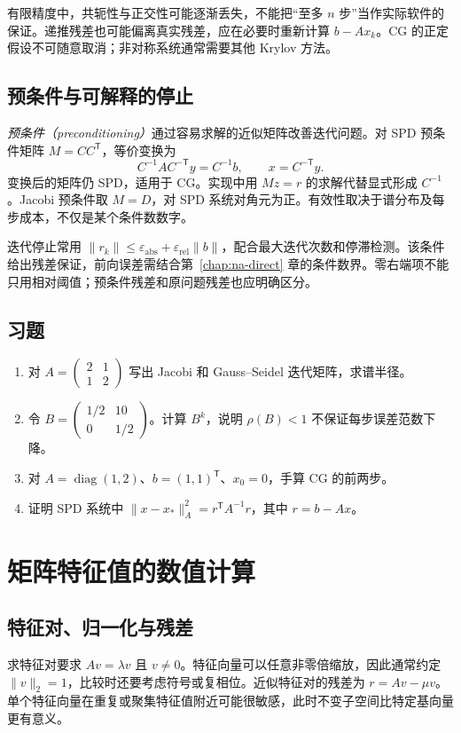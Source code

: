 \documentclass[UTF8,12pt,a4paper,fontset=fandol]{ctexbook}
\begin{document}
有限精度中，共轭性与正交性可能逐渐丢失，不能把“至多 $n$ 步”当作实际软件的保证。递推残差也可能偏离真实残差，应在必要时重新计算 $b-Ax_k$。CG 的正定假设不可随意取消；非对称系统通常需要其他 Krylov 方法。

\section{预条件与可解释的停止}
\emph{预条件（preconditioning）}通过容易求解的近似矩阵改善迭代问题。对 SPD 预条件矩阵 $M=CC^{\mathsf T}$，等价变换为
\[
 C^{-1}AC^{-\mathsf T}y=C^{-1}b,\qquad x=C^{-\mathsf T}y.
\]
变换后的矩阵仍 SPD，适用于 CG。实现中用 $Mz=r$ 的求解代替显式形成 $C^{-1}$。Jacobi 预条件取 $M=D$，对 SPD 系统对角元为正。有效性取决于谱分布及每步成本，不仅是某个条件数数字。

迭代停止常用 $\|r_k\|\le\varepsilon_{\mathrm{abs}}+\varepsilon_{\mathrm{rel}}\|b\|$，配合最大迭代次数和停滞检测。该条件给出残差保证，前向误差需结合第~\ref{chap:na-direct} 章的条件数界。零右端项不能只用相对阈值；预条件残差和原问题残差也应明确区分。

\section{习题}
\begin{enumerate}[label=\arabic*.]
\item\label{exr:na-iter-jacobi} 对 $A=\begin{pmatrix}2&1\\1&2\end{pmatrix}$ 写出 Jacobi 和 Gauss--Seidel 迭代矩阵，求谱半径。
\item\label{exr:na-iter-nonnormal} 令 $B=\begin{pmatrix}1/2&10\\0&1/2\end{pmatrix}$。计算 $B^k$，说明 $\rho(B)<1$ 不保证每步误差范数下降。
\item\label{exr:na-iter-cg} 对 $A=\operatorname{diag}(1,2)$、$b=(1,1)^{\mathsf T}$、$x_0=0$，手算 CG 的前两步。
\item\label{exr:na-iter-energy} 证明 SPD 系统中 $\|x-x_*\|_A^2=r^{\mathsf T}A^{-1}r$，其中 $r=b-Ax$。
\end{enumerate}

\chapter{矩阵特征值的数值计算}
\label{chap:na-eigen}

\section{特征对、归一化与残差}
求特征对要求 $Av=\lambda v$ 且 $v\ne0$。特征向量可以任意非零倍缩放，因此通常约定 $\|v\|_2=1$，比较时还要考虑符号或复相位。近似特征对的残差为 $r=Av-\mu v$。单个特征向量在重复或聚集特征值附近可能很敏感，此时不变子空间比特定基向量更有意义。
\end{document}

